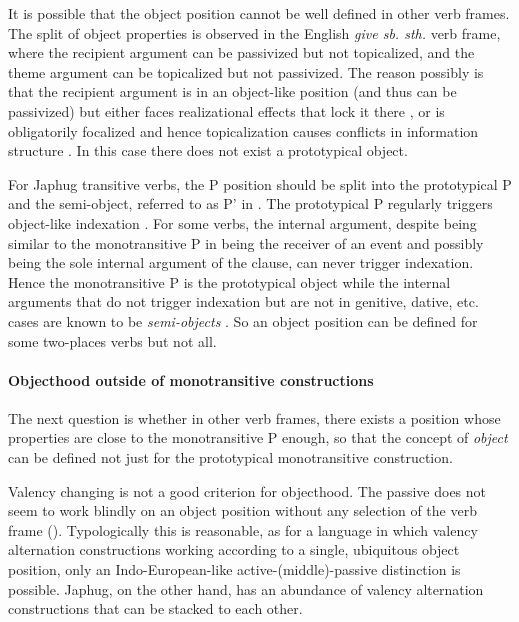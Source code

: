 \documentclass[a4paper, oneside, 12pt]{report}
\newcommand*{\citesec}[1]{\S~{#1}}
\newcommand*{\citepage}[1]{p.~{#1}}
\newcommand*{\term}[1]{\emph{#1}}
\newcommand{\form}[1]{\emph{#1}}
\begin{document}
It is possible that the object position cannot be well defined in other verb frames. 
The split of object properties is observed in the English \form{give sb. sth.} verb frame,
where the recipient argument can be passivized but not topicalized,
and the theme argument can be topicalized but not passivized.
The reason possibly is that the recipient argument is in an object-like position
(and thus can be passivized)
but either faces realizational effects that lock it there 
\citep{oba2005double},
or is obligatorily focalized and hence topicalization causes conflicts in information structure
\citep{im2005alternative}.
In this case there does not exist a prototypical object.

For Japhug transitive verbs, 
the P position should be split into the prototypical P
and the semi-object, referred to as P' in \citet{jacques2016subjects}.
The prototypical P regularly triggers object-like indexation
\citep[\citesec{8.1.3}, \citepage{543}]{jacques2021grammar}.
For some verbs, the internal argument,
despite being similar to the monotransitive P in being the receiver of an event 
and possibly being the sole internal argument of the clause,
can never trigger indexation.
Hence the monotransitive P is the prototypical object
while the internal arguments that do not trigger indexation 
but are not in genitive, dative, etc. cases
are known to be \term{semi-objects}
\citep[\citesec{8.1.5}]{jacques2021grammar}.
So an object position can be defined for some two-places verbs but not all.

\paragraph*{Objecthood outside of monotransitive constructions}
\label{sec:grammatical.clause.internal.object}
The next question is whether in other verb frames,
there exists a position whose properties are close to the monotransitive P enough,
so that the concept of \term{object} can be defined not just for 
the prototypical monotransitive construction. 

Valency changing is not a good criterion for objecthood.
The passive does not seem to work blindly on an object position
without any selection of the verb frame
().
Typologically this is reasonable,
as for a language in which valency alternation constructions 
working according to a single, ubiquitous object position,
only an Indo-European-like active-(middle)-passive distinction is possible.
Japhug, on the other hand, has an abundance of valency alternation constructions
that can be stacked to each other.
\end{document}
